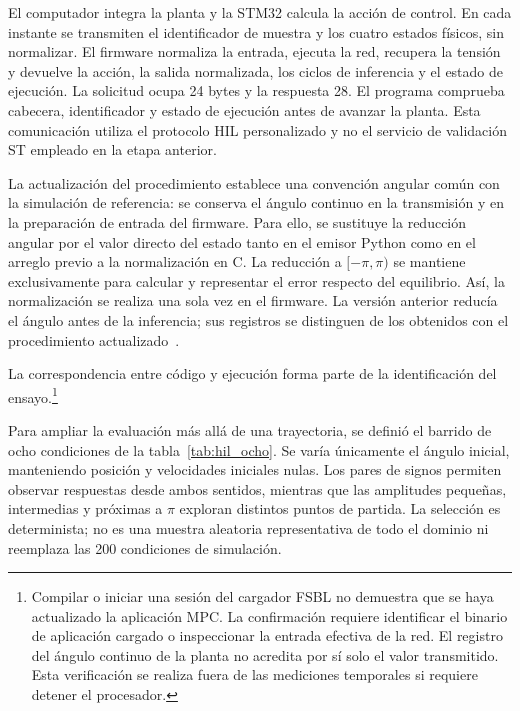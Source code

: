 El computador integra la planta y la STM32 calcula la acción de control. En cada instante se transmiten el identificador de muestra y los cuatro estados físicos, sin normalizar. El firmware normaliza la entrada, ejecuta la red, recupera la tensión y devuelve la acción, la salida normalizada, los ciclos de inferencia y el estado de ejecución. La solicitud ocupa 24 bytes y la respuesta 28. El programa comprueba cabecera, identificador y estado de ejecución antes de avanzar la planta. Esta comunicación utiliza el protocolo HIL personalizado y no el servicio de validación ST empleado en la etapa anterior.

La actualización del procedimiento establece una convención angular común con la simulación de referencia: se conserva el ángulo continuo en la transmisión y en la preparación de entrada del firmware. Para ello, se sustituye la reducción angular por el valor directo del estado tanto en el emisor Python como en el arreglo previo a la normalización en C. La reducción a $[-\pi,\pi)$ se mantiene exclusivamente para calcular y representar el error respecto del equilibrio. Así, la normalización se realiza una sola vez en el firmware. La versión anterior reducía el ángulo antes de la inferencia; sus registros se distinguen de los obtenidos con el procedimiento actualizado~\cite{cap5_hil_actualizado}.

La correspondencia entre código y ejecución forma parte de la identificación del ensayo.\footnote{Compilar o iniciar una sesión del cargador FSBL no demuestra que se haya actualizado la aplicación MPC. La confirmación requiere identificar el binario de aplicación cargado o inspeccionar la entrada efectiva de la red. El registro del ángulo continuo de la planta no acredita por sí solo el valor transmitido. Esta verificación se realiza fuera de las mediciones temporales si requiere detener el procesador.}

Para ampliar la evaluación más allá de una trayectoria, se definió el barrido de ocho condiciones de la tabla~\ref{tab:hil_ocho}. Se varía únicamente el ángulo inicial, manteniendo posición y velocidades iniciales nulas. Los pares de signos permiten observar respuestas desde ambos sentidos, mientras que las amplitudes pequeñas, intermedias y próximas a $\pi$ exploran distintos puntos de partida. La selección es determinista; no es una muestra aleatoria representativa de todo el dominio ni reemplaza las 200 condiciones de simulación.

